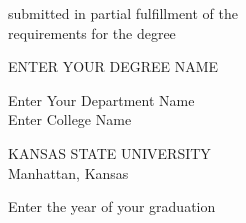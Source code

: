 \begin{center}
   \vspace{0.5cm}
   \begin{singlespace}
   submitted in partial fulfillment of the\\
   requirements for the degree\\
   \end{singlespace}

   \vspace{0.5cm}



   {\large ENTER YOUR DEGREE NAME}\\
   \vspace{0.5cm}


   \begin{singlespace}
   Enter Your Department Name\\
   Enter College Name\\
   \end{singlespace}

   \vspace{0.5cm}

   \begin{singlespace}
   {\Large KANSAS STATE UNIVERSITY}\\
   Manhattan, Kansas\\
   \end{singlespace}


   Enter the year of your graduation\\
   \vspace{1cm}

\end{center}

